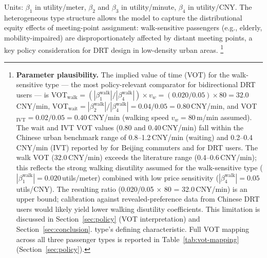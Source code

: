 Units: $\beta_1$ in utility/meter, $\beta_2$ and $\beta_3$ in utility/minute, $\beta_4$ in
utility/CNY. The heterogeneous type structure allows the model to capture the distributional
equity effects of meeting-point assignment: walk-sensitive passengers (e.g., elderly,
mobility-impaired) are disproportionately affected by distant meeting points, a key
policy consideration for DRT design in low-density urban areas.%
\footnote{%
  \textbf{Parameter plausibility.}
  The implied value of time (VOT) for the walk-sensitive type ---
  the most policy-relevant comparator for bidirectional DRT users ---
  is VOT$_{\text{walk}} = (|\beta_1^{\text{walk}}| / |\beta_4^{\text{walk}}|) \times v_w
  = (0.020/0.05) \times 80 = 32.0$\,CNY/min,
  VOT$_{\text{wait}} = |\beta_2^{\text{walk}}| / |\beta_4^{\text{walk}}| = 0.04/0.05 = 0.80$\,CNY/min,
  and VOT$_{\text{IVT}} = 0.02/0.05 = 0.40$\,CNY/min (walking speed $v_w = 80$\,m/min assumed).
  The wait and IVT VOT values (0.80 and 0.40\,CNY/min) fall within the Chinese urban
  benchmark range of 0.8--1.2\,CNY/min (waiting) and 0.2--0.4\,CNY/min (IVT) reported
  by \citet{shao2017} for Beijing commuters and \citet{li2020drt} for DRT users.
  The walk VOT (32.0\,CNY/min) exceeds the literature range (0.4--0.6\,CNY/min);
  this reflects the strong walking disutility assumed for the walk-sensitive type
  ($|\beta_1^{\text{walk}}| = 0.020$\,utils/meter) combined with low price sensitivity
  ($|\beta_4^{\text{walk}}| = 0.05$\,utils/CNY). The resulting ratio
  (0.020/0.05 $\times$ 80 = 32.0\,CNY/min) is an upper bound; calibration against
  revealed-preference data from Chinese DRT users would likely yield lower walking
  disutility coefficients. This limitation is discussed in
  Section~\ref{sec:policy} (VOT interpretation) and Section~\ref{sec:conclusion}.
  type's defining characteristic.
  Full VOT mapping across all three passenger types is reported in
  Table~\ref{tab:vot-mapping} (Section~\ref{sec:policy}).
}

